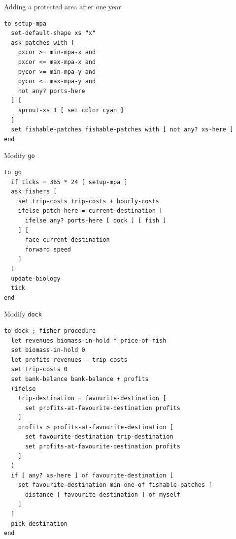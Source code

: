 \documentclass[table, 14pt, aspectratio=169]{beamer}
\begin{document}
\begin{frame}[fragile=singleslide]{Adding a protected area after one year}
  \begin{adjustbox}{max height=0.8\textheight, max width = \linewidth}
    \begin{verbatim}
to setup-mpa
  set-default-shape xs "x"
  ask patches with [ 
    pxcor >= min-mpa-x and 
    pxcor <= max-mpa-x and 
    pycor >= min-mpa-y and
    pycor <= max-mpa-y and
    not any? ports-here
  ] [
    sprout-xs 1 [ set color cyan ]
  ]
  set fishable-patches fishable-patches with [ not any? xs-here ]
end
    \end{verbatim}
  \end{adjustbox}
\end{frame}

\begin{frame}[fragile=singleslide]{Modify \texttt{go}}
  \begin{adjustbox}{max height=0.8\textheight, max width = \linewidth}
    \begin{verbatim}
to go
  if ticks = 365 * 24 [ setup-mpa ]
  ask fishers [
    set trip-costs trip-costs + hourly-costs
    ifelse patch-here = current-destination [
      ifelse any? ports-here [ dock ] [ fish ]
    ] [
      face current-destination
      forward speed
    ]
  ]
  update-biology
  tick
end
    \end{verbatim}
  \end{adjustbox}
\end{frame}

\begin{frame}[fragile=singleslide]{Modify \texttt{dock}}
    \scriptsize
    \begin{verbatim}
to dock ; fisher procedure
  let revenues biomass-in-hold * price-of-fish
  set biomass-in-hold 0
  let profits revenues - trip-costs
  set trip-costs 0
  set bank-balance bank-balance + profits
  (ifelse
    trip-destination = favourite-destination [
      set profits-at-favourite-destination profits
    ]
    profits > profits-at-favourite-destination [
      set favourite-destination trip-destination
      set profits-at-favourite-destination profits
    ]
  )
  if [ any? xs-here ] of favourite-destination [
    set favourite-destination min-one-of fishable-patches [ 
      distance [ favourite-destination ] of myself
    ]
  ]
  pick-destination
end
    \end{verbatim}
\end{frame}
\end{document}
